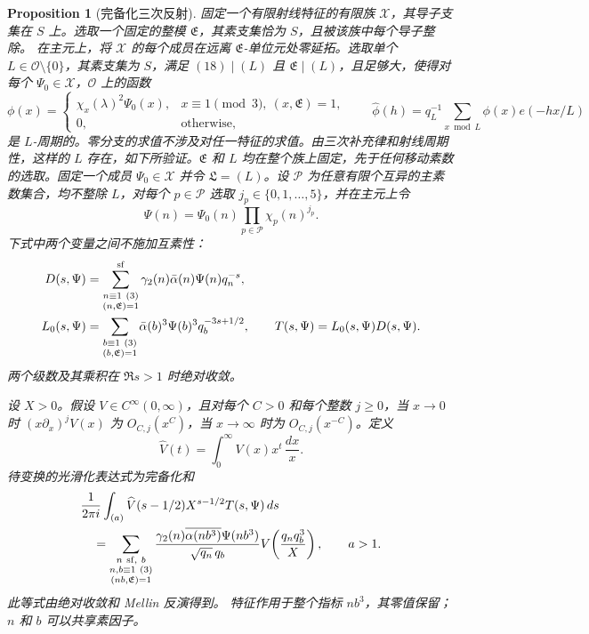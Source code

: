 \documentclass[11pt,a4paper]{article}
\numberwithin{equation}{section}
\numberwithin{figure}{section}
\newtheorem{proposition}[theorem]{Proposition}
\theoremstyle{definition}
\theoremstyle{remark}
\begin{document}
\begin{proposition}[完备化三次反射]
\label{prop:completed-reflection}
固定一个有限射线特征的有限族 $\mathcal X$，其导子支集在 $S$ 上。选取一个固定的整模 $\mathfrak E$，其素支集恰为 $S$，且被该族中每个导子整除。
在主元上，将 $\mathcal X$ 的每个成员在远离 $\mathfrak E$-单位元处零延拓。选取单个 $L\in\mathcal O\setminus\{0\}$，其素支集为 $S$，满足 $(18)\mid(L)$ 且 $\mathfrak E\mid(L)$，且足够大，使得对每个 $\Psi_0\in\mathcal X$，$\mathcal O$ 上的函数
\[
 \phi(x)=
 \begin{cases}
 \chi_x(\lambda)^2\Psi_0(x),&x\equiv1\pmod3,\ (x,\mathfrak E)=1,\\
 0,&\text{otherwise},
 \end{cases}
 \qquad
 \widehat\phi(h)=q_L^{-1}\sum_{x\bmod L}\phi(x)e(-hx/L)
\]
是 $L$-周期的。零分支的求值不涉及对任一特征的求值。由三次补充律和射线周期性，这样的 $L$ 存在，如下所验证。$\mathfrak E$ 和 $L$ 均在整个族上固定，先于任何移动素数的选取。固定一个成员 $\Psi_0\in\mathcal X$ 并令 $\mathfrak L=(L)$。设 $\mathcal P$ 为任意有限个互异的主素数集合，均不整除 $L$，对每个 $p\in\mathcal P$ 选取 $j_p\in\{0,1,\ldots,5\}$，并在主元上令
\[
 \Psi(n)=\Psi_0(n)\prod_{p\in\mathcal P}\chi_p(n)^{j_p}.
\]
下式中两个变量之间不施加互素性：
\[
 \begin{split}
 D(s,\Psi)&=\sum_{\substack{n\equiv1\ (3)\\(n,\mathfrak E)=1}}^{\rm sf}
       \gamma_2(n)\bar\alpha(n)\Psi(n)q_n^{-s},\\
 L_0(s,\Psi)&=\sum_{\substack{b\equiv1\ (3)\\(b,\mathfrak E)=1}}
       \bar\alpha(b)^3\Psi(b)^3q_b^{-3s+1/2},
       \qquad T(s,\Psi)=L_0(s,\Psi)D(s,\Psi).
 \end{split}
\]
两个级数及其乘积在 $\Re s>1$ 时绝对收敛。

设 $X>0$。假设 $V\in C^\infty(0,\infty)$，且对每个 $C>0$ 和每个整数 $j\ge0$，当 $x\to0$ 时 $(x\partial_x)^jV(x)$ 为 $O_{C,j}(x^C)$，当 $x\to\infty$ 时为 $O_{C,j}(x^{-C})$。定义
\[
 \widehat V(t)=\int_0^\infty V(x)x^t\,\frac{dx}{x}.
\]
待变换的光滑化表达式为完备化和
\[
 \begin{split}
 &\frac1{2\pi i}\int_{(a)}\widehat V(s-1/2)X^{s-1/2}T(s,\Psi)\,ds\\
 &\quad=\sum_{\substack{n\ {\rm sf},\ b\\n,b\equiv1\ (3)\\(nb,\mathfrak E)=1}}
 \frac{\gamma_2(n)\overline{\alpha(nb^3)}\Psi(nb^3)}
      {\sqrt{q_n}\,q_b}
 V\!\left(\frac{q_nq_b^3}{X}\right),\qquad a>1.
 \end{split}
\]
此等式由绝对收敛和 Mellin 反演得到。
特征作用于整个指标 $nb^3$，其零值保留；
$n$ 和 $b$ 可以共享素因子。


\end{proposition}
\end{document}
